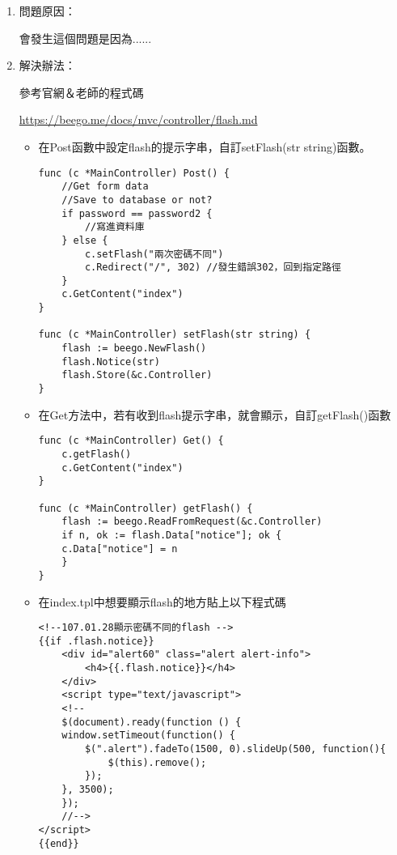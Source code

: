 

\begin{enumerate}
	\item 問題原因：
	
	會發生這個問題是因為......
	
	
	\item 解決辦法：
	
	參考官網＆老師的程式碼

	\url{https://beego.me/docs/mvc/controller/flash.md}

	\begin{itemize}
		\item 在Post函數中設定flash的提示字串，自訂setFlash(str string)函數。
		
		\begin{lstlisting}
func (c *MainController) Post() {
	//Get form data
	//Save to database or not?
	if password == password2 {
		//寫進資料庫
	} else {
		c.setFlash("兩次密碼不同")
		c.Redirect("/", 302) //發生錯誤302，回到指定路徑
	}
	c.GetContent("index")
}

func (c *MainController) setFlash(str string) {
	flash := beego.NewFlash()
	flash.Notice(str)
	flash.Store(&c.Controller)
}

		\end{lstlisting}
		
		\item 在Get方法中，若有收到flash提示字串，就會顯示，自訂getFlash()函數
		
\begin{lstlisting}
func (c *MainController) Get() {
	c.getFlash()
	c.GetContent("index")
}

func (c *MainController) getFlash() {
	flash := beego.ReadFromRequest(&c.Controller)
	if n, ok := flash.Data["notice"]; ok {
	c.Data["notice"] = n
	}
}

\end{lstlisting}
		
		\item 在index.tpl中想要顯示flash的地方貼上以下程式碼
		
\begin{lstlisting}
<!--107.01.28顯示密碼不同的flash -->
{{if .flash.notice}}
	<div id="alert60" class="alert alert-info">
		<h4>{{.flash.notice}}</h4>
	</div>
	<script type="text/javascript">
	<!--
	$(document).ready(function () {
	window.setTimeout(function() {
		$(".alert").fadeTo(1500, 0).slideUp(500, function(){
			$(this).remove(); 
		});
	}, 3500);
	});
	//-->
</script>
{{end}}
\end{lstlisting}
		
	\end{itemize}
\end{enumerate}

